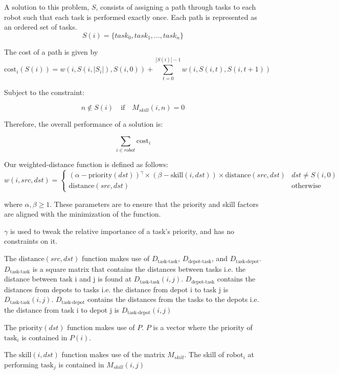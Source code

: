 \documentclass[a4paper]{article}
\begin{document}
A solution to this problem, $S$, consists of assigning a path through tasks to each robot such that each task is performed exactly once. Each path is represented as an ordered set of tasks.
$$S(i) = \{\mathit{task}_0, \mathit{task}_1, ..., \mathit{task}_n\}$$

The cost of a path is given by
$$
\text{cost}_i(S(i)) = w(i, S(i,|S_i|), S(i,0)) + \sum_{t = 0}^{|S(i)|-1} w(i, S(i,t), S(i,t+1))
$$

Subject to the constraint:

$$
n \notin S(i) \quad \text{if} \quad M_{skill}(i, n) = 0
$$

Therefore, the overall performance of a solution is:

$$
\sum_{i \in \mathit{robot}} \text{cost}_i
$$

Our weighted-distance function is defined as follows:
$$
w(i, \mathit{src}, \mathit{dst}) = \begin{cases}
(\alpha - \text{priority}(\mathit{dst}))^\gamma \times (\beta - \text{skill}(i, \mathit{dst})) \times \text{distance}(\mathit{src}, \mathit{dst}) & \mathit{dst} \ne S(i,0) \\
\text{distance}(\mathit{src}, \mathit{dst}) & \text{otherwise}
\end{cases}
$$

where $\alpha, \beta \geq 1$. These parameters are to ensure that the priority and skill factors are aligned with the minimization of the function.

$\gamma$ is used to tweak the relative importance of a task's priority, and has no constraints on it.

The $\text{distance}(\mathit{src}, \mathit{dst})$ function makes use of $D_\text{task-task}$, $D_\text{depot-task}$, and $D_\text{task-depot}$. $D_\text{task-task}$ is a square matrix that contains the distances between tasks i.e. the distance between task i and j is found at $D_\text{task-task}(i,j)$. $D_\text{depot-task}$ contains the distances from depots to tasks i.e. the distance from depot i to task j is $D_\text{task-task}(i,j)$. $D_\text{task-depot}$ contains the distances from the tasks to the depots i.e. the distance from task i to depot j is $D_\text{task-depot}(i,j)$

The $\text{priority}(\mathit{dst})$ function makes use of $P$. $P$ is a vector where the priority of $\text{task}_i$ is contained in $P(i)$.

The $\text{skill}(i, \mathit{dst})$ function makes use of the matrix $M_{skill}$. The skill of $\text{robot}_i$ at performing $\text{task}_j$ is contained in $M_{skill}(i,j)$
\end{document}
